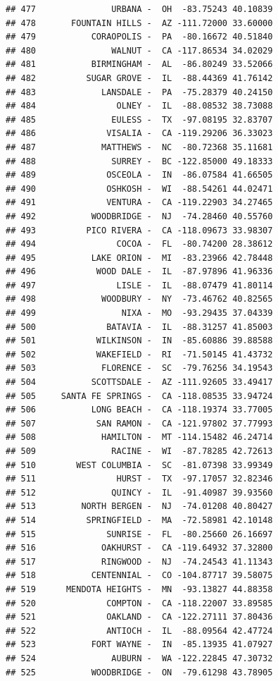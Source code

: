 \documentclass{article}\usepackage[]{graphicx}\usepackage[]{color}
\makeatletter
\newenvironment{kframe}{%
 \def\at@end@of@kframe{}%
 \ifinner\ifhmode%
  \def\at@end@of@kframe{\end{minipage}}%
  \begin{minipage}{\columnwidth}%
 \fi\fi%
 \def\FrameCommand##1{\hskip\@totalleftmargin \hskip-\fboxsep
 \colorbox{shadecolor}{##1}\hskip-\fboxsep
     \hskip-\linewidth \hskip-\@totalleftmargin \hskip\columnwidth}%
 \MakeFramed {\advance\hsize-\width
   \@totalleftmargin\z@ \linewidth\hsize
   \@setminipage}}%
 {\par\unskip\endMakeFramed%
 \at@end@of@kframe}
\newenvironment{knitrout}{}{} %
\makeatother
\begin{document}
\begin{knitrout}
\begin{kframe}
\begin{verbatim}
## 477               URBANA -  OH  -83.75243 40.10839
## 478       FOUNTAIN HILLS -  AZ -111.72000 33.60000
## 479           CORAOPOLIS -  PA  -80.16672 40.51840
## 480               WALNUT -  CA -117.86534 34.02029
## 481           BIRMINGHAM -  AL  -86.80249 33.52066
## 482          SUGAR GROVE -  IL  -88.44369 41.76142
## 483             LANSDALE -  PA  -75.28379 40.24150
## 484                OLNEY -  IL  -88.08532 38.73088
## 485               EULESS -  TX  -97.08195 32.83707
## 486              VISALIA -  CA -119.29206 36.33023
## 487             MATTHEWS -  NC  -80.72368 35.11681
## 488               SURREY -  BC -122.85000 49.18333
## 489              OSCEOLA -  IN  -86.07584 41.66505
## 490              OSHKOSH -  WI  -88.54261 44.02471
## 491              VENTURA -  CA -119.22903 34.27465
## 492           WOODBRIDGE -  NJ  -74.28460 40.55760
## 493          PICO RIVERA -  CA -118.09673 33.98307
## 494                COCOA -  FL  -80.74200 28.38612
## 495           LAKE ORION -  MI  -83.23966 42.78448
## 496            WOOD DALE -  IL  -87.97896 41.96336
## 497                LISLE -  IL  -88.07479 41.80114
## 498             WOODBURY -  NY  -73.46762 40.82565
## 499                 NIXA -  MO  -93.29435 37.04339
## 500              BATAVIA -  IL  -88.31257 41.85003
## 501            WILKINSON -  IN  -85.60886 39.88588
## 502            WAKEFIELD -  RI  -71.50145 41.43732
## 503             FLORENCE -  SC  -79.76256 34.19543
## 504           SCOTTSDALE -  AZ -111.92605 33.49417
## 505     SANTA FE SPRINGS -  CA -118.08535 33.94724
## 506           LONG BEACH -  CA -118.19374 33.77005
## 507            SAN RAMON -  CA -121.97802 37.77993
## 508             HAMILTON -  MT -114.15482 46.24714
## 509               RACINE -  WI  -87.78285 42.72613
## 510        WEST COLUMBIA -  SC  -81.07398 33.99349
## 511                HURST -  TX  -97.17057 32.82346
## 512               QUINCY -  IL  -91.40987 39.93560
## 513         NORTH BERGEN -  NJ  -74.01208 40.80427
## 514          SPRINGFIELD -  MA  -72.58981 42.10148
## 515              SUNRISE -  FL  -80.25660 26.16697
## 516             OAKHURST -  CA -119.64932 37.32800
## 517             RINGWOOD -  NJ  -74.24543 41.11343
## 518           CENTENNIAL -  CO -104.87717 39.58075
## 519      MENDOTA HEIGHTS -  MN  -93.13827 44.88358
## 520              COMPTON -  CA -118.22007 33.89585
## 521              OAKLAND -  CA -122.27111 37.80436
## 522              ANTIOCH -  IL  -88.09564 42.47724
## 523           FORT WAYNE -  IN  -85.13935 41.07927
## 524               AUBURN -  WA -122.22845 47.30732
## 525           WOODBRIDGE -  ON  -79.61298 43.78905

\end{verbatim}
\end{kframe}
\end{knitrout}
\end{document}
